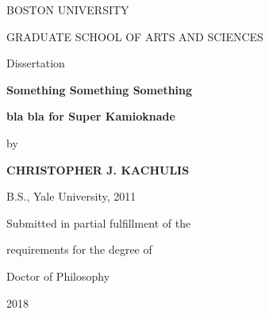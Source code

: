 

\begin{comment}

\title{Something Something SK}

\author{Christopher J. Kachulis}

\today

\maketitle

\end{comment}




\begin{titlepage}

\begin{singlespace}
\centerline{BOSTON UNIVERSITY}
\bigskip
\centerline{GRADUATE SCHOOL OF ARTS AND SCIENCES}
\vskip0.875in
\centerline{Dissertation}
\vskip0.875in
\centerline{\bf Something Something Something}
\bigskip
\centerline{\bf bla bla for Super Kamioknade}
\vskip0.5in
\centerline{by}
\vskip0.5in
\centerline{\bf CHRISTOPHER J. KACHULIS}
\bigskip
\centerline{B.S., Yale University, 2011}
\vfill
\centerline{Submitted in partial fulfillment of the}
\bigskip
\centerline{requirements for the degree of}
\bigskip
\centerline{Doctor of Philosophy}
\bigskip
\centerline{2018}
\end{singlespace}

\end{titlepage}

